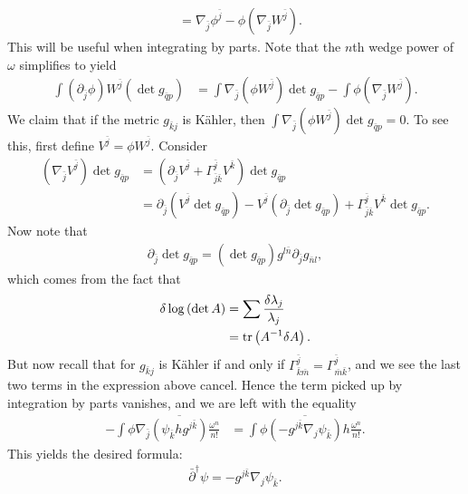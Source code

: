 \documentclass{../mathnotes}
\begin{document}
\begin{enumerate}[(a)]
\begin{align*}
            &=\nabla_{\bar j} \phi^{\bar j}-\phi\left( \nabla_{\bar j} W^{\bar j}\right).
        \end{align*}
        This will be useful when integrating by parts.  Note that the $n$th wedge power of $\omega$ simplifies to yield
        \begin{align*}
            \int\left( \partial_{\bar j}\phi\right)W^{\bar j}\left( \det g_{\bar qp} \right)&=\int\nabla_{\bar j}\left( \phi W^{\bar j}\right)\det g_{\bar qp}
            -\int \phi\left( \nabla_{\bar j}W^{\bar j}\right).
        \end{align*}
        We claim that if the metric $g_{\bar kj}$ is K\"ahler, then $\int \nabla_{\bar j}(\phi W^{\bar j})\det g_{\bar qp}=0$. To see this, first define
        $V^{\bar j}=\phi W^{\bar j}$. Consider
        \begin{align*}
            \left( \nabla_{\bar j}V^{\bar j} \right)\det g_{\bar qp}&=\left(\partial_{\bar j}V^{\bar j}+\Gamma^{\bar j}_{\bar j\bar k}V^{\bar k}\right)\det g_{\bar qp}\\
            &=\partial_{\bar j}\left( V^{\bar j}\det g_{\bar qp} \right)-V^{\bar j}\left( \partial_{\bar j}\det g_{\bar qp} \right)+\Gamma^{\bar j}_{\bar j\bar k}V^{\bar k}\det g_{\bar qp}.
        \end{align*}
        Now note that
        \begin{align*}
            \partial_{\bar j}\det g_{\bar qp}=\left( \det g_{\bar qp}\right)g^{l\bar n}\partial_{\bar j}g_{\bar nl},
        \end{align*}
        which comes from the fact that
        \begin{align*}
            \delta\log\left( \det A \right)&=\sum\frac{\delta \lambda_j}{\lambda_j}\\
            &=\operatorname{tr}\left( A^{-1}\delta A \right).
        \end{align*}
        But now recall that for $g_{\bar kj}$ is K\"ahler if and only if $\Gamma^{\bar j}_{\bar k\bar m}=\Gamma^{\bar j}_{\bar m\bar k}$,
        and we see the last two terms in  the expression above cancel. Hence the term picked up by integration by parts vanishes,
        and we are left with the equality
        \begin{align*}
            -\int\phi\nabla_{\bar j}\overline{\left( \psi_{\bar k}hg^{j\bar k} \right)}\frac{\omega^n}{n!}&=
            \int\phi\overline{\left( -g^{j\bar k}\nabla_j\psi_{\bar k} \right)}h\frac{\omega^n}{n!}.
        \end{align*}
        This yields the desired formula:
        \begin{align*}
            \boxed{\bar\partial^\dagger\psi=-g^{j\bar k}\nabla_j\psi_{\bar k}.}
        \end{align*}


\end{enumerate}
\end{document}
